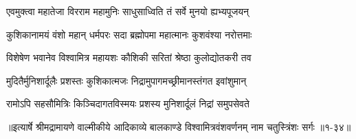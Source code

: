 \twolineshloka
{एवमुक्त्वा महातेजा विरराम महामुनिः}
{साधुसाध्विति तं सर्वे मुनयो ह्यभ्यपूजयन्} %

\twolineshloka
{कुशिकानामयं वंशो महान् धर्मपरः सदा}
{ब्रह्मोपमा महात्मानः कुशवंश्या नरोत्तमाः} %

\twolineshloka
{विशेषेण भवानेव विश्वामित्र महायशः}
{कौशिकी सरितां श्रेष्ठा कुलोद्योतकरी तव} %

\twolineshloka
{मुदितैर्मुनिशार्दूलैः प्रशस्तः कुशिकात्मजः}
{निद्रामुपागमच्छ्रीमानस्तंगत इवांशुमान्} %

\twolineshloka
{रामोऽपि सहसौमित्रिः किञ्चिदागतविस्मयः}
{प्रशस्य मुनिशार्दूलं निद्रां समुपसेवते} %


॥इत्यार्षे श्रीमद्रामायणे वाल्मीकीये आदिकाव्ये बालकाण्डे विश्वामित्रवंशवर्णनम् नाम चतुस्त्रिंशः सर्गः ॥१-३४॥
